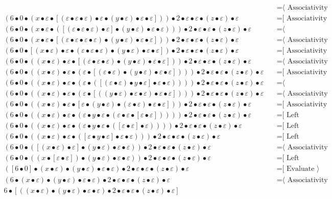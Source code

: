 \documentclass{article}
\begin{document}
\begin{align*}
  & \quad \text{=⟨ Associativity ]}\\
(6 • 0 • (x • ε • [(ε • ε • ε) • ε • (y • ε) • ε • ε])) • 2 • ε • ε • (z • ε) • ε
  & \quad \text{=[ Associativity ⟩}\\
(6 • 0 • (x • ε • ([(ε • ε • ε) • ε] • (y • ε) • ε • ε))) • 2 • ε • ε • (z • ε) • ε
  & \quad \text{=⟨ Commutativity ]}\\
(6 • 0 • (x • ε • [(ε • ε • ε • ε) • (y • ε) • ε • ε])) • 2 • ε • ε • (z • ε) • ε
  & \quad \text{=⟨ Associativity ]}\\
(6 • 0 • [(x • ε) • ε • (ε • ε • ε) • (y • ε) • ε • ε]) • 2 • ε • ε • (z • ε) • ε
  & \quad \text{=[ Associativity ⟩}\\
(6 • 0 • ((x • ε) • ε • [(ε • ε • ε) • (y • ε) • ε • ε])) • 2 • ε • ε • (z • ε) • ε
  & \quad \text{=⟨ Associativity ]}\\
(6 • 0 • ((x • ε) • ε • (ε • [(ε • ε) • (y • ε) • ε • ε]))) • 2 • ε • ε • (z • ε) • ε
  & \quad \text{=[ Associativity ⟩}\\
(6 • 0 • ((x • ε) • ε • (ε • ([(ε • ε) • y • ε] • ε • ε)))) • 2 • ε • ε • (z • ε) • ε
  & \quad \text{=⟨ Commutativity ]}\\
(6 • 0 • ((x • ε) • ε • (ε • [((y • ε) • ε • ε) • ε • ε]))) • 2 • ε • ε • (z • ε) • ε
  & \quad \text{=⟨ Associativity ]}\\
(6 • 0 • ((x • ε) • ε • [ε • (y • ε) • (ε • ε) • ε • ε])) • 2 • ε • ε • (z • ε) • ε
  & \quad \text{=[ Associativity ⟩}\\
(6 • 0 • ((x • ε) • ε • (ε • y • ε • (ε • ε • [ε • ε])))) • 2 • ε • ε • (z • ε) • ε
  & \quad \text{=[ Left neutrality ⟩}\\
(6 • 0 • ((x • ε) • ε • (ε • y • ε • ([ε • ε] • ε)))) • 2 • ε • ε • (z • ε) • ε
  & \quad \text{=[ Left neutrality ⟩}\\
(6 • 0 • ((x • ε) • ε • ([ε • y • ε] • ε • ε))) • 2 • ε • ε • (z • ε) • ε
  & \quad \text{=[ Left neutrality ⟩}\\
(6 • 0 • ([(x • ε) • ε] • (y • ε) • ε • ε)) • 2 • ε • ε • (z • ε) • ε
  & \quad \text{=⟨ Associativity ]}\\
(6 • 0 • ((x • [ε • ε]) • (y • ε) • ε • ε)) • 2 • ε • ε • (z • ε) • ε
  & \quad \text{=[ Left neutrality ⟩}\\
([6 • 0] • (x • ε) • (y • ε) • ε • ε) • 2 • ε • ε • (z • ε) • ε
  & \quad \text{=[ Evaluate ⟩}\\
(6 • (x • ε) • (y • ε) • ε • ε) • 2 • ε • ε • (z • ε) • ε
  & \quad \text{=⟨ Associativity ]}\\
6 • [((x • ε) • (y • ε) • ε • ε) • 2 • ε • ε • (z • ε) • ε]

\end{align*}
\end{document}
